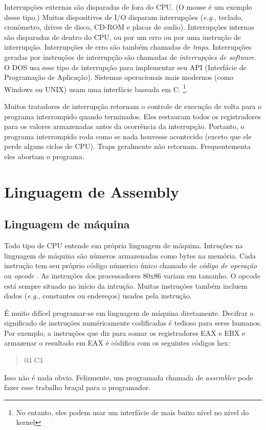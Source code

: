 Interrupções externas são disparadas de fora do CPU. (O mouse é um exemplo
desse tipo.) Muitos dispositivos de I/O disparam interrupções ({\em e.g.\/},
teclado, cronômetro, drives de disco, CD-ROM e placas de audio). Interrupções
internas são disparadas de dentro do CPU, ou por um erro ou por uma instrução
de interrupção. Interrupções de erro são também chamadas de \emph{traps}.
Interrupções geradas por instruções de interrupção são chamadas de
\emph{interrupções de software}. O DOS usa esse tipo de interrupção para
implementar seu API (Interfácie de Programação de Aplicação). Sistemas
operacionais mais modernos (como Windows ou UNIX) usam uma interfácie baseada
em C. \footnote{No entanto, eles podem usar um interfácie de mais baixo nível
no nível do kernel}.

Muitos tratadores de interrupção retornam o controle de execução de volta
para o programa interrompido quando terminados. Eles restauram todos os
registradores para os valores armazenadas antes da ocorrência da interrupção.
Portanto, o programa interrompido roda como se nada houvesse acontecido (exceto
que ele perde alguns ciclos de CPU). Traps geralmente não retornam.
Frequentementa eles abortam o programa.

\section{Linguagem de Assembly}

\subsection{Linguagem de máquina}

Todo tipo de CPU entende sua própria linguagem de máquina. Intruções na
linguagem de máquina são números armazenadas como bytes na memória. Cada
instrução tem seu próprio código númerico único chamado de \emph{código de
operação} ou \emph{opcode} . As instruções dos processadores
80x86 variam em tamanho. O opcode está sempre situado no início da intrução.
Muitas instruções também incluem dados ({\em e.g.\/}, constantes ou endereços)
usados pela instrução.

É muito difícel programar-se em linguagem de máquina diretamente. Decifrar o
significado de instruções numéricamente codificadas é tedioso para seres
humanos. Por exemplo, a instruções que diz para somar os registradores EAX e
EBX e armazenar o resultado em EAX é códifica com os seguintes códigos hex:
\begin{quote}
   03 C3
\end{quote}
Isso não é nada obvio. Felizmente, um programada chamada de \emph{assembler}
 pode fazer esse trabalho braçal para o programador.

